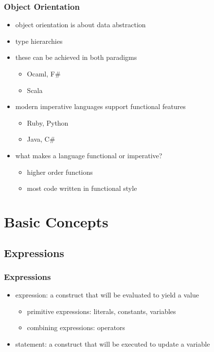 \documentclass[dvipsnames]{beamer}
\theoremstyle{plain}
\begin{document}
\begin{frame}
  \frametitle{Object Orientation}

  \begin{itemize}
    \item object orientation is about data abstraction
    \item type hierarchies

    \medskip
    \item these can be achieved in both paradigms
    \begin{itemize}
      \item Ocaml, F\#
      \item Scala
    \end{itemize}
    \item modern imperative languages support functional features
    \begin{itemize}
      \item Ruby, Python
      \item Java, C\#
    \end{itemize}

    \pause
    \bigskip
    \item what makes a language functional or imperative?
    \begin{itemize}
      \item higher order functions
      \item most code written in functional style
    \end{itemize}
  \end{itemize}
\end{frame}

\section{Basic Concepts}

\subsection{Expressions}

\begin{frame}
  \frametitle{Expressions}

  \medskip
  \begin{itemize}
    \item \alert{expression}: a construct that will be evaluated
      to yield a value
    \begin{itemize}
      \item primitive expressions: literals, constants, variables
      \item combining expressions: operators
    \end{itemize}

    \pause
    \medskip
    \item \alert{statement}: a construct that will be executed
      to update a variable
  \end{itemize}
\end{frame}
\end{document}
